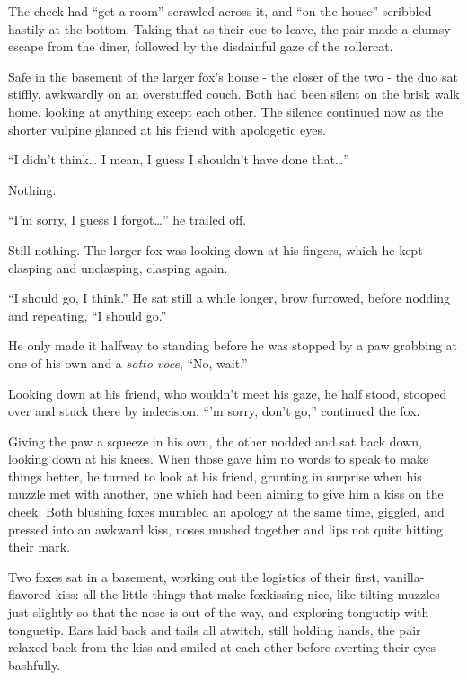 The check had ``get a room'' scrawled across it, and ``on the house'' scribbled hastily at the bottom. Taking that as their cue to leave, the pair made a clumsy escape from the diner, followed by the disdainful gaze of the rollercat.

\secdiv{}

\noindent Safe in the basement of the larger fox's house - the closer of the two - the duo sat stiffly, awkwardly on an overstuffed couch. Both had been silent on the brisk walk home, looking at anything except each other. The silence continued now as the shorter vulpine glanced at his friend with apologetic eyes.

``I didn't think\ldots{} I mean, I guess I shouldn't have done that\ldots{}''

Nothing.

``I'm sorry, I guess I forgot\ldots{}'' he trailed off.

Still nothing. The larger fox was looking down at his fingers, which he kept clasping and unclasping, clasping again.

``I should go, I think.'' He sat still a while longer, brow furrowed, before nodding and repeating, ``I should go.''

He only made it halfway to standing before he was stopped by a paw grabbing at one of his own and a \emph{sotto voce}, ``No, wait.''

Looking down at his friend, who wouldn't meet his gaze, he half stood, stooped over and stuck there by indecision. ``'m sorry, don't go,'' continued the fox.

Giving the paw a squeeze in his own, the other nodded and sat back down, looking down at his knees. When those gave him no words to speak to make things better, he turned to look at his friend, grunting in surprise when his muzzle met with another, one which had been aiming to give him a kiss on the cheek. Both blushing foxes mumbled an apology at the same time, giggled, and pressed into an awkward kiss, noses mushed together and lips not quite hitting their mark.

Two foxes sat in a basement, working out the logistics of their first, vanilla-flavored kiss: all the little things that make foxkissing nice, like tilting muzzles just slightly so that the nose is out of the way, and exploring tonguetip with tonguetip. Ears laid back and tails all atwitch, still holding hands, the pair relaxed back from the kiss and smiled at each other before averting their eyes bashfully.

